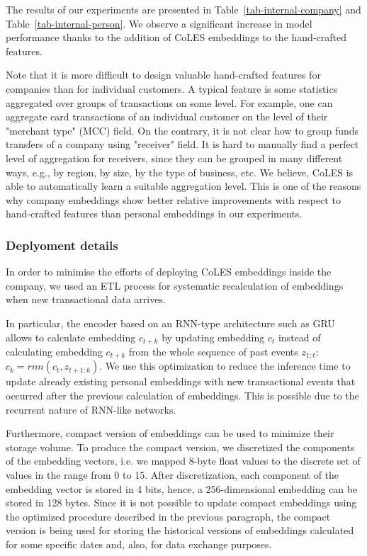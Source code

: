\documentclass[sigconf]{acmart}
\begin{document}
The results of our experiments are presented in Table~\ref{tab-internal-company} and Table~\ref{tab-internal-person}. We observe a significant increase in model performance thanks to the addition of CoLES embeddings to the hand-crafted features.

Note that it is more difficult to design valuable hand-crafted features for companies than for individual customers. A typical feature is some statistics aggregated over groups of transactions on some level. For example, one can aggregate card transactions of an individual customer on the level of their "merchant type" (MCC) field. On the contrary, it is not clear how to group funds transfers of a company using "receiver" field. It is hard to manually find a perfect level of aggregation for receivers, since they can be grouped in many different ways, e.g., by region, by size, by the type of business, etc. We believe, CoLES is able to automatically learn a suitable aggregation level. This is one of the reasons why company embeddings show better relative improvements with respect to hand-crafted features than personal embeddings in our experiments.

\subsubsection{Deplyoment details} \label{sec-deployment}

In order to minimise the efforts of deploying CoLES embeddings inside the company, we used an ETL process for systematic recalculation of embeddings when new transactional data arrives.

In particular, the encoder based on an RNN-type architecture such as GRU~\citep{Cho2014LearningPR} allows to calculate embedding $c_{t+k}$ by updating embedding $c_t$ instead of  calculating embedding $c_{t+k}$ from the whole sequence of past events $z_{1:t}$: $c_k = rnn(c_t, z_{t+1:k})$. We use this optimization to reduce the inference time to update already existing personal embeddings with new transactional events that occurred after the previous calculation of embeddings. This is possible due to the recurrent nature of RNN-like networks.

Furthermore, compact version of embeddings can be used to minimize their storage volume. To produce the compact version, we discretized the components of the embedding vectors, i.e. we mapped 8-byte float values to the discrete set of values in the range from 0 to 15. After discretization, each component of the embedding vector is stored in 4 bits, hence, a 256-dimensional embedding can be stored in 128 bytes. Since it is not possible to update compact embeddings using the optimized procedure described in the previous paragraph, the compact version is being used for storing the historical versions of embeddings calculated for some specific dates and, also, for data exchange purposes.
\end{document}
